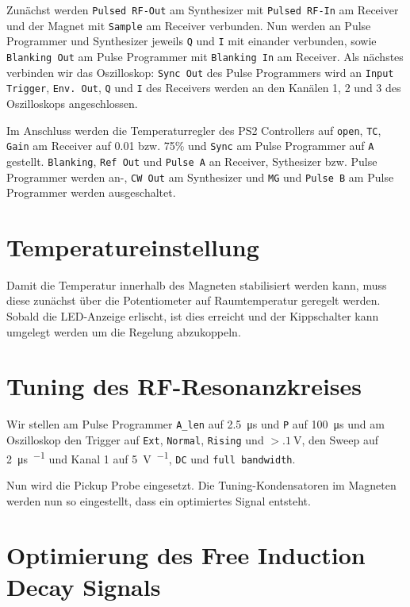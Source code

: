 Zunächst werden \texttt{Pulsed RF-Out} am Synthesizer mit \texttt{Pulsed
RF-In} am Receiver und der Magnet mit \texttt{Sample} am Receiver verbunden.
Nun werden an Pulse Programmer und Synthesizer jeweils \texttt{Q} und
\texttt{I} mit einander verbunden, sowie \texttt{Blanking Out} am Pulse
Programmer mit \texttt{Blanking In} am Receiver. Als nächstes verbinden wir
das Oszilloskop: \texttt{Sync Out} des Pulse Programmers wird an
\texttt{Input Trigger}, \texttt{Env. Out}, \texttt{Q} und \texttt{I} des
Receivers werden an den Kanälen 1, 2 und 3 des Oszilloskops angeschlossen.

Im Anschluss werden die Temperaturregler des PS2 Controllers auf
\texttt{open}, \texttt{TC}, \texttt{Gain} am Receiver
auf \num{0.01} bzw. 75\% und \texttt{Sync} am Pulse Programmer
auf \texttt{A} gestellt.
\texttt{Blanking}, \texttt{Ref Out} und \texttt{Pulse A} an
Receiver, Sythesizer bzw. Pulse Programmer werden an-, \texttt{CW Out} am
Synthesizer und \texttt{MG} und \texttt{Pulse B} am Pulse Programmer werden
ausgeschaltet. 

\section{Temperatureinstellung}

Damit die Temperatur innerhalb des Magneten stabilisiert werden kann, muss
diese zunächst über die Potentiometer auf Raumtemperatur geregelt werden.
Sobald die LED-Anzeige erlischt, ist dies erreicht und der Kippschalter kann
umgelegt werden um die Regelung abzukoppeln.

\section{Tuning des RF-Resonanzkreises}

Wir stellen am Pulse Programmer \texttt{A\_len} auf \SI{2.5}{\micro\second} und
\texttt P auf \SI{100}{\micro\second} und am Oszilloskop den Trigger auf
\texttt{Ext}, \texttt{Normal}, \texttt{Rising} und $> \SI{.1}{\volt}$, den
Sweep auf \SI{2}{\micro\second\per\division} und Kanal 1 auf
\SI{5}{\volt\per\division}, \texttt{DC} und \texttt{full bandwidth}.

Nun wird die Pickup Probe eingesetzt. Die Tuning-Kondensatoren im Magneten
werden nun so eingestellt, dass ein optimiertes Signal entsteht.

\section{Optimierung des Free Induction Decay Signals}

